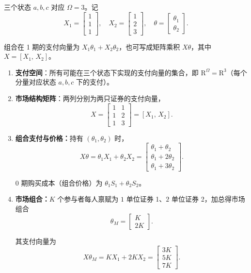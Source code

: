 \begin{solution}[blank-type=manual,blank-vsep=9\baselineskip]
三个状态 $a,b,c$ 对应 $\Omega=3$。记
\[
    X_1=\begin{bmatrix}1 \\ 1 \\ 1\end{bmatrix},\quad
    X_2=\begin{bmatrix}1 \\ 2 \\ 3\end{bmatrix},\quad
    \theta=\begin{bmatrix}\theta_1 \\ \theta_2\end{bmatrix}.
\]

组合在 1 期的支付向量为 $X_1\theta_1+X_2\theta_2$，也可写成矩阵乘积 $X\theta$，其中 $X=[X_1,\,X_2]$。

\begin{enumerate}[label=(\alph*)]
    \item \textbf{支付空间}：所有可能在三个状态下实现的支付向量的集合，即 $\mathrm{R}^{\Omega}=\mathrm{R}^{3}$（每个分量对应状态 $a,b,c$ 下的支付）。

    \item \textbf{市场结构矩阵}：两列分别为两只证券的支付向量，
    \[
        X=\begin{bmatrix}1&1\\1&2\\1&3\end{bmatrix}=[X_1,\,X_2].
    \]

    \item \textbf{组合支付与价格：}持有 $(\theta_1,\theta_2)$ 时，
    \[
        X\theta=\theta_1 X_1+\theta_2 X_2=
        \begin{bmatrix}\theta_1+\theta_2 \\ \theta_1+2\theta_2 \\ \theta_1+3\theta_2\end{bmatrix}.
    \]

    0 期购买成本（组合价格）为 $\theta_1 S_1+\theta_2 S_2$。

    \item \textbf{市场组合：}$K$ 个参与者每人禀赋为 $1$ 单位证券 1、$2$ 单位证券 2，加总得市场组合
    \[
        \theta_M=\begin{bmatrix}K \\ 2K\end{bmatrix}.
    \]

    其支付向量为
    \[
        X\theta_M=K X_1+2K X_2=
        \begin{bmatrix}3K \\ 5K \\ 7K\end{bmatrix}.
    \]


\end{enumerate}
\end{solution}
